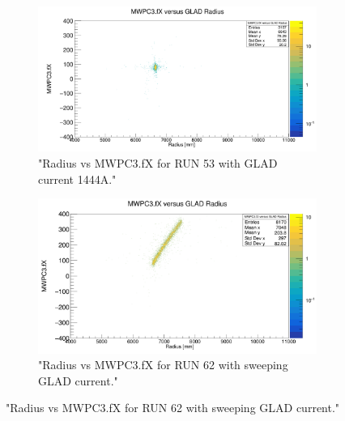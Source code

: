 \documentclass[12pt, letterpaper]{article}
\begin{document}
\begin{figure}[!htbp]
\begin{subfigure}{.9\textwidth}
	\centering
	\includegraphics[width=.9\linewidth]{mw3_vs_rad_run53.png}
	\caption{"Radius vs MWPC3.fX for RUN 53 with GLAD current 1444A."}
	\label{fig:sub-second}
\end{subfigure}	
\begin{subfigure}{.9\textwidth}
	\centering
	\includegraphics[width=.9\linewidth]{mw3_vs_rad_62.png}
	\caption{"Radius vs MWPC3.fX for RUN 62 with sweeping GLAD current."}
	\label{fig:sub-second}
\end{subfigure}
\end{figure}
\end{document}
